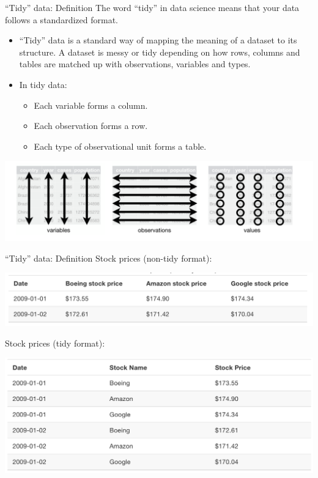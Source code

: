 \documentclass[
  ignorenonframetext,
]{beamer}
\providecommand{\tightlist}{%
  \setlength{\itemsep}{0pt}\setlength{\parskip}{0pt}}
\begin{document}
\begin{frame}{``Tidy'' data: Definition}
\protect\hypertarget{tidy-data-definition}{}
The word ``tidy'' in data science means that your data follows a
standardized format.

\begin{itemize}
\item
  ``Tidy'' data is a standard way of mapping the meaning of a dataset to
  its structure. A dataset is messy or tidy depending on how rows,
  columns and tables are matched up with observations, variables and
  types.
\item
  In tidy data:

  \begin{itemize}
  \tightlist
  \item
    Each variable forms a column.
  \item
    Each observation forms a row.
  \item
    Each type of observational unit forms a table.
  \end{itemize}
\end{itemize}

\begin{center}\includegraphics[width=0.6\linewidth,height=0.25\textheight]{week3new2} \end{center}
\end{frame}

\begin{frame}{``Tidy'' data: Definition}
\protect\hypertarget{tidy-data-definition-1}{}
Stock prices (non-tidy format):

\begin{center}\includegraphics[width=0.7\linewidth,height=0.25\textheight]{week3new3} \end{center}

Stock prices (tidy format):

\begin{center}\includegraphics[width=0.6\linewidth,height=0.4\textheight]{week3new4} \end{center}
\end{frame}
\end{document}
